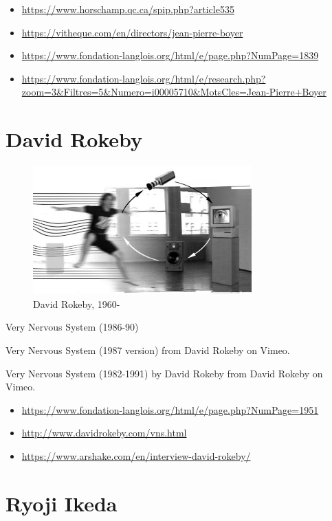 \documentclass[
  french,
]{book}
\providecommand{\tightlist}{%
  \setlength{\itemsep}{0pt}\setlength{\parskip}{0pt}}
\begin{document}
\begin{itemize}
\tightlist
\item
  \url{https://www.horschamp.qc.ca/spip.php?article535}
\item
  \url{https://vitheque.com/en/directors/jean-pierre-boyer}
\item
  \url{https://www.fondation-langlois.org/html/e/page.php?NumPage=1839}
\item
  \url{https://www.fondation-langlois.org/html/e/research.php?zoom=3\&Filtres=5\&Numero=i00005710\&MotsCles=Jean-Pierre+Boyer}
\end{itemize}

\hypertarget{david-rokeby}{%
\section{David Rokeby}\label{david-rokeby}}

\begin{figure}
\centering
\includegraphics[width=0.75\textwidth,height=\textheight]{medias/corpus/rokeby/d00004229-wide.jpg}
\caption{David Rokeby, 1960-}
\end{figure}

Very Nervous System (1986-90)

Very Nervous System (1987 version) from David Rokeby on Vimeo.

Very Nervous System (1982-1991) by David Rokeby from David Rokeby on Vimeo.

\begin{itemize}
\tightlist
\item
  \url{https://www.fondation-langlois.org/html/e/page.php?NumPage=1951}
\item
  \url{http://www.davidrokeby.com/vns.html}
\item
  \url{https://www.arshake.com/en/interview-david-rokeby/}
\end{itemize}

\hypertarget{ryoji-ikeda}{%
\section{Ryoji Ikeda}\label{ryoji-ikeda}}
\end{document}
